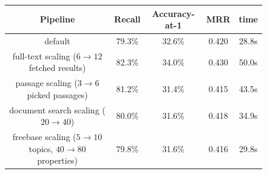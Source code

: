\documentclass{poster15}
\begin{document}
\begin{figure}[t]
\renewcommand{\arraystretch}{1.3}
\centering
\begin{tabular}{|c|cccc|}
\hline
Pipeline & Recall & Accuracy-at-1 & MRR & time \\ \hline \hline
default & 79.3\% & 32.6\% & 0.420 & 28.8s \\
\hline
full-text scaling ($6\to12$ fetched results) & 82.3\% & 34.0\% & 0.430 & 50.0s \\

passage scaling ($3\to6$ picked passages) & 81.2\% & 31.4\% & 0.415 & 43.5s \\

document search scaling ($20\to40$) & 80.0\% & 31.6\% & 0.418 & 34.9s \\

freebase scaling ($5\to10$ topics, $40\to80$ properties) & 79.8\% & 31.6\% & 0.416 & 29.8s \\


\end{tabular}
\end{figure}
\end{document}
